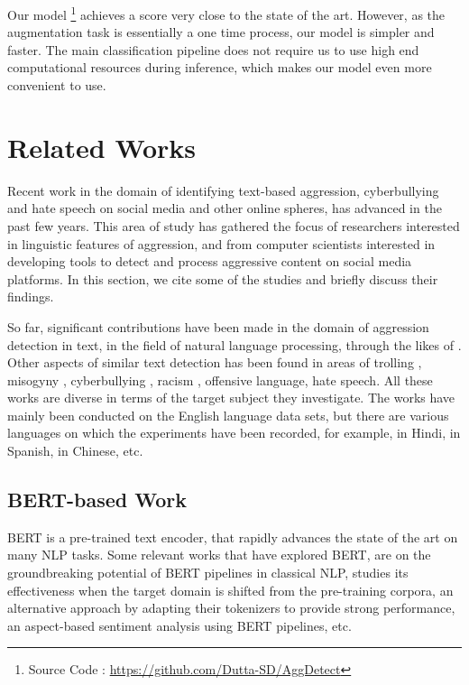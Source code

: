 \documentclass[conference]{IEEEtran}
\begin{document}
Our model
\footnote{Source Code : \url{https://github.com/Dutta-SD/AggDetect}}
achieves a score very close to the state of the art. However, as the augmentation task is essentially a one time process, our model is simpler and faster. The main classification pipeline does not require us to use high end computational resources during inference, which makes our model even more convenient to use.


\section{Related Works}

Recent work in the domain of identifying text-based aggression, cyberbullying and hate speech on social media and other online spheres, has advanced in the past few years. This area of study has gathered the focus of researchers interested in linguistic features of aggression, and from computer scientists interested in developing tools to detect and process aggressive content on social media platforms. In this section, we cite some of the studies and briefly discuss their findings. 

So far, significant contributions have been made in the domain of aggression detection in text, in the field of natural language processing, through the likes of \cite{razavi2010offensive} \cite{kumar2018trac}\cite{kumar2020evaluating}. 
Other aspects of similar text detection has been found in areas of trolling \cite{cambria2010not}\cite{mihaylov2015finding}\cite{de2018modeling}, 
misogyny \cite{anzovino2018automatic}, 
cyberbullying \cite{dadvar2013improving}\cite{xu2012learning}, 
racism \cite{greevy2004automatic}, 
offensive language\cite{nobata2016abusive}, 
hate speech\cite{inproceedings}\cite{davidson2017automated}. 
All these works are diverse in terms of the target subject they investigate. The works have mainly been conducted on the English language data sets, but there are various languages on which the experiments have been recorded, for example, in Hindi\cite{mandla2021overview}, in Spanish\cite{garibo-i-orts-2019-multilingual}, in Chinese\cite{su-etal-2017-rephrasing}, etc.

\subsection{BERT-based Work}
BERT is a pre-trained text encoder, that rapidly advances the state of the art on many NLP tasks. Some relevant works that have explored BERT, are \cite{tenney2019bert} on the groundbreaking potential of BERT pipelines in classical NLP, \cite{wan2021enhancing} studies its effectiveness when the target domain is shifted from the pre-training corpora, \cite{sachidananda2021efficient} an alternative approach by adapting their tokenizers to provide strong performance, \cite{azhar2021finetuning} an aspect-based sentiment analysis using BERT pipelines, etc.
\end{document}
